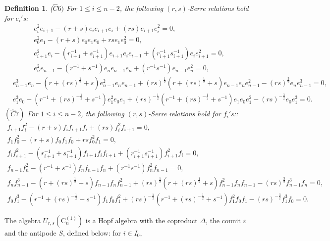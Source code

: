 \documentclass[10pt,a4paper]{amsart}
\newtheorem{defi}[theorem]{Definition}
\numberwithin{equation}{section}
\begin{document}
\begin{defi}
		($\hat{C} 6)$ For $1 \leqslant i \leqslant n-2$, the following $(r, s)$-Serre relations hold for $e_i'$s:
	$$
	\begin{gathered}
		e_i^2 e_{i+1}-(r+s) e_i e_{i+1} e_i+(r s) e_{i+1} e_i^2=0, \\
		e_0^2 e_1-(r+s) e_0 e_1 e_0+r s e_1 e_0^2=0, \\
		e_{i+1}^2 e_i-\left(r_{i+1}^{-1}+s_{i+1}^{-1}\right) e_{i+1} e_i e_{i+1}+\left(r_{i+1}^{-1} s_{i+1}^{-1}\right) e_i e_{i+1}^2=0, \\
		e_n^2 e_{n-1}-\left(r^{-1}+s^{-1}\right) e_n e_{n-1} e_n+\left(r^{-1} s^{-1}\right) e_{n-1} e_n^2=0,
	\end{gathered}
	$$
	$$
	\begin{aligned}
		& e_{n-1}^3 e_n-\left(r+(r s)^{\frac{1}{2}}+s\right) e_{n-1}^2 e_n e_{n-1}+(r s)^{\frac{1}{2}}\left(r+(r s)^{\frac{1}{2}}+s\right) e_{n-1} e_n e_{n-1}^2-(r s)^{\frac{3}{2}} e_n e_{n-1}^3=0, \\
		& e_1^3 e_0-\left(r^{-1}+(r s)^{-\frac{1}{2}}+s^{-1}\right) e_1^2 e_0 e_1+(r s)^{-\frac{1}{2}}\left(r^{-1}+(r s)^{-\frac{1}{2}}+s^{-1}\right) e_1 e_0 e_1^2-(r s)^{-\frac{3}{2}} e_0 e_1^3=0.
	\end{aligned}
	$$
		$(\hat{C} 7)$ For $1 \leqslant i \leqslant n-2$, the following $(r, s)$-Serre relations hold for $f_i'$s::
	$$
	\begin{gathered}
		f_{i+1} f_i^2-(r+s) f_i f_{i+1} f_i+(r s) f_i^2 f_{i+1}=0, \\
		f_1 f_0^2-(r+s) f_0 f_1 f_0+r s f_0^2 f_1=0, \\
		f_i f_{i+1}^2-\left(r_{i+1}^{-1}+s_{i+1}^{-1}\right) f_{i+1} f_i f_{i+1}+\left(r_{i+1}^{-1} s_{i+1}^{-1}\right) f_{i+1}^2 f_i=0, \\
		f_{n-1} f_n^2-\left(r^{-1}+s^{-1}\right) f_n f_{n-1} f_n+\left(r^{-1} s^{-1}\right) f_n^2 f_{n-1}=0, \\
		f_n f_{n-1}^3-\left(r+(r s)^{\frac{1}{2}}+s\right) f_{n-1} f_n f_{n-1}^2+(r s)^{\frac{1}{2}}\left(r+(r s)^{\frac{1}{2}}+s\right) f_{n-1}^2 f_n f_{n-1}-(r s)^{\frac{3}{2}} f_{n-1}^3 f_n=0, \\
		f_0 f_1^3-\left(r^{-1}+(r s)^{-\frac{1}{2}}+s^{-1}\right) f_1 f_0 f_1^2+(r s)^{-\frac{1}{2}}\left(r^{-1}+(r s)^{-\frac{1}{2}}+s^{-1}\right) f_1^2 f_0 f_1-(r s)^{-\frac{3}{2}} f_1^3 f_0=0 .
	\end{gathered}
	$$
\end{defi}
The algebra $U_{r, s}\left(\mathrm{C}_n^{(1)}\right)$  is a Hopf algebra with the coproduct $\Delta$, the counit $\varepsilon$ and the antipode $S$, defined below: for $i \in I_0$,
\end{document}
